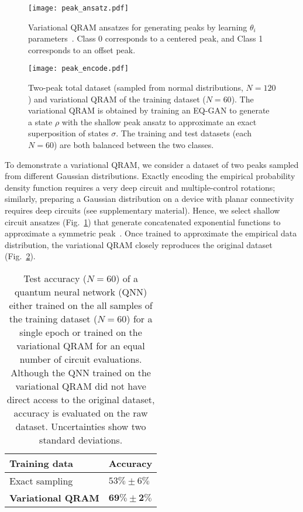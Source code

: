 \documentclass[prl,superscriptaddress,twocolumn]{revtex4}
\theoremstyle{plain}
\theoremstyle{definition}
\begin{document}
\begin{figure}[h!]
\begin{center}
\texttt{[image: peak\_ansatz.pdf]}
\caption{Variational QRAM ansatzes for generating peaks by learning $\theta_i$ parameters~\cite{PhysRevA.102.012612}. Class 0 corresponds to a centered peak, and Class 1 corresponds to an offset peak.}
\label{fig:pansatz}
\end{center}
\end{figure}

\begin{figure}[h!]
\begin{center}
\texttt{[image: peak\_encode.pdf]}
\caption{Two-peak total dataset (sampled from normal distributions, $N=120$) and variational QRAM of the training dataset ($N=60$). The variational QRAM is obtained by training an EQ-GAN to generate a state $\rho$ with the shallow peak ansatz to approximate an exact superposition of states $\sigma$. The training and test datasets (each $N=60$) are both balanced between the two classes.}
\label{fig:pencode}
\end{center}
\end{figure} 

To demonstrate a variational QRAM, we consider a dataset of two peaks sampled from different Gaussian distributions. Exactly encoding the empirical probability density function requires a very deep circuit and multiple-control rotations; similarly, preparing a Gaussian distribution on a device with planar connectivity requires deep circuits (see supplementary material). Hence, we select shallow circuit ansatzes (Fig.~\ref{fig:pansatz}) that generate concatenated exponential functions to approximate a symmetric peak~\cite{PhysRevA.102.012612}. Once trained to approximate the empirical data distribution, the variational QRAM closely reproduces the original dataset (Fig.~\ref{fig:pencode}).

\begin{table}[h!]
\centering
\begin{tabular}{ p{4cm}||p{2cm} }
 Training data & Accuracy\\
 \hline
 Exact sampling & $53\% \pm 6\%$ \\
 \textbf{Variational QRAM} & $\mathbf{69\% \pm 2\%}$
  \end{tabular} 
 \caption{Test accuracy ($N=60$) of a quantum neural network (QNN) either trained on the all samples of the training dataset ($N=60$) for a single epoch or trained on the variational QRAM for an equal number of circuit evaluations. Although the QNN trained on the variational QRAM did not have direct access to the original dataset, accuracy is evaluated on the raw dataset. Uncertainties show two standard deviations.}
 \label{tab:res}
\end{table}
\end{document}
